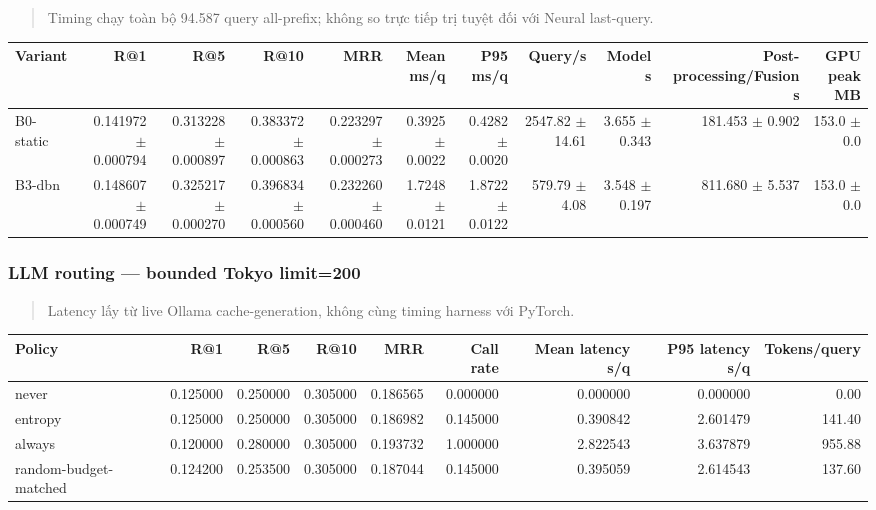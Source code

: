 \begin{quote}\small Timing chạy toàn bộ 94.587 query all-prefix; không so trực tiếp trị tuyệt đối với Neural last-query.\end{quote}
\begin{table}[!htbp]
\centering
\scriptsize
\setlength{\tabcolsep}{2.5pt}
\begin{adjustbox}{max width=\textwidth}
\begin{tabular}{@{}lrrrrrrrrrr@{}}
\toprule
Variant & R@1 & R@5 & R@10 & MRR & Mean ms/q & P95 ms/q & Query/s & Model s & Post-processing/Fusion s & GPU peak MB \\
\midrule
B0-static & 0.141972 $\pm$ 0.000794 & 0.313228 $\pm$ 0.000897 & 0.383372 $\pm$ 0.000863 & 0.223297 $\pm$ 0.000273 & 0.3925 $\pm$ 0.0022 & 0.4282 $\pm$ 0.0020 & 2547.82 $\pm$ 14.61 & 3.655 $\pm$ 0.343 & 181.453 $\pm$ 0.902 & 153.0 $\pm$ 0.0 \\
B3-dbn & 0.148607 $\pm$ 0.000749 & 0.325217 $\pm$ 0.000270 & 0.396834 $\pm$ 0.000560 & 0.232260 $\pm$ 0.000460 & 1.7248 $\pm$ 0.0121 & 1.8722 $\pm$ 0.0122 & 579.79 $\pm$ 4.08 & 3.548 $\pm$ 0.197 & 811.680 $\pm$ 5.537 & 153.0 $\pm$ 0.0 \\
\bottomrule
\end{tabular}
\end{adjustbox}
\end{table}

\subsubsection*{LLM routing --- bounded Tokyo limit=200}

\begin{quote}\small Latency lấy từ live Ollama cache-generation, không cùng timing harness với PyTorch.\end{quote}
\begin{table}[!htbp]
\centering
\scriptsize
\setlength{\tabcolsep}{2.5pt}
\begin{adjustbox}{max width=\textwidth}
\begin{tabular}{@{}lrrrrrrrr@{}}
\toprule
Policy & R@1 & R@5 & R@10 & MRR & Call rate & Mean latency s/q & P95 latency s/q & Tokens/query \\
\midrule
never & 0.125000 & 0.250000 & 0.305000 & 0.186565 & 0.000000 & 0.000000 & 0.000000 & 0.00 \\
entropy & 0.125000 & 0.250000 & 0.305000 & 0.186982 & 0.145000 & 0.390842 & 2.601479 & 141.40 \\
always & 0.120000 & 0.280000 & 0.305000 & 0.193732 & 1.000000 & 2.822543 & 3.637879 & 955.88 \\
random-budget-matched & 0.124200 & 0.253500 & 0.305000 & 0.187044 & 0.145000 & 0.395059 & 2.614543 & 137.60 \\
\bottomrule
\end{tabular}
\end{adjustbox}
\end{table}

